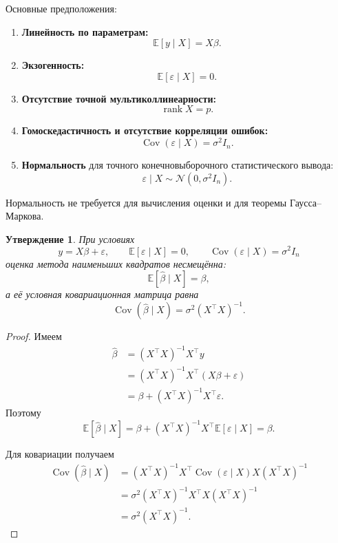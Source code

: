 \documentclass[12pt,a4paper]{article}
\newtheorem{proposition}[theorem]{Утверждение}
\theoremstyle{definition}
\theoremstyle{remark}
\newcommand{\E}{\mathbb{E}}
\newcommand{\Cov}{\operatorname{Cov}}
\newcommand{\rank}{\operatorname{rank}}
\begin{document}
Основные предположения:

\begin{enumerate}
    \item \textbf{Линейность по параметрам:}
          \[
              \E[y\mid X]=X\beta.
          \]
    \item \textbf{Экзогенность:}
          \[
              \E[\varepsilon\mid X]=0.
          \]
    \item \textbf{Отсутствие точной мультиколлинеарности:}
          \[
              \rank X=p.
          \]
    \item \textbf{Гомоскедастичность и отсутствие корреляции ошибок:}
          \[
              \Cov(\varepsilon\mid X)=\sigma^2I_n.
          \]
    \item \textbf{Нормальность} для точного конечновыборочного статистического
          вывода:
          \[
              \varepsilon\mid X\sim
              \mathcal{N}(0,\sigma^2I_n).
          \]
\end{enumerate}

Нормальность не требуется для вычисления оценки и для теоремы
Гаусса--Маркова.

\begin{proposition}
При условиях
\[
    y=X\beta+\varepsilon,
    \qquad
    \E[\varepsilon\mid X]=0,
    \qquad
    \Cov(\varepsilon\mid X)=\sigma^2I_n
\]
оценка метода наименьших квадратов несмещённа:
\[
    \E[\widehat\beta\mid X]=\beta,
\]
а её условная ковариационная матрица равна
\[
    \Cov(\widehat\beta\mid X)
    =
    \sigma^2(X^\top X)^{-1}.
\]
\end{proposition}

\begin{proof}
Имеем
\[
\begin{split}
    \widehat\beta
    &=
    (X^\top X)^{-1}X^\top y\\
    &=
    (X^\top X)^{-1}X^\top(X\beta+\varepsilon)\\
    &=
    \beta+(X^\top X)^{-1}X^\top\varepsilon.
\end{split}
\]
Поэтому
\[
    \E[\widehat\beta\mid X]
    =
    \beta+
    (X^\top X)^{-1}X^\top
    \E[\varepsilon\mid X]
    =
    \beta.
\]

Для ковариации получаем
\[
\begin{split}
    \Cov(\widehat\beta\mid X)
    &=
    (X^\top X)^{-1}X^\top
    \Cov(\varepsilon\mid X)
    X(X^\top X)^{-1}\\
    &=
    \sigma^2
    (X^\top X)^{-1}X^\top X(X^\top X)^{-1}\\
    &=
    \sigma^2(X^\top X)^{-1}.
\end{split}
\]
\end{proof}
\end{document}
